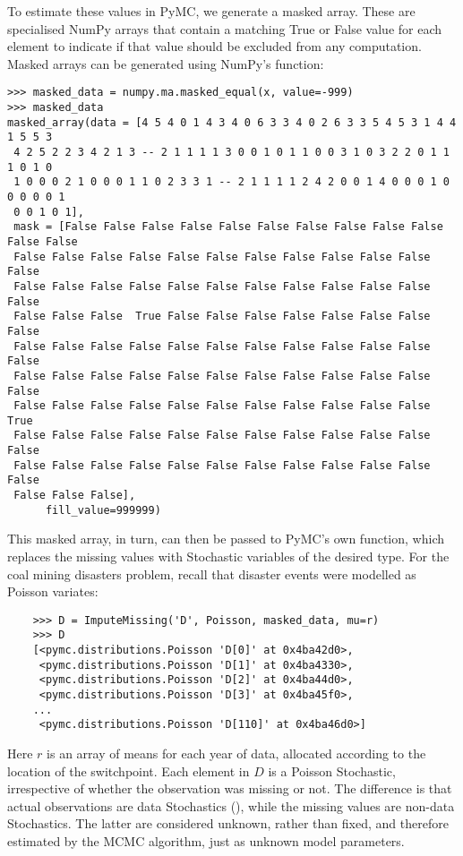 To estimate these values in PyMC, we generate a masked array. These are specialised NumPy arrays that contain a matching True or False value for each element to indicate if that value should be excluded from any computation. Masked arrays can be generated using NumPy's  function: 
\begin{verbatim}
>>> masked_data = numpy.ma.masked_equal(x, value=-999)
>>> masked_data
masked_array(data = [4 5 4 0 1 4 3 4 0 6 3 3 4 0 2 6 3 3 5 4 5 3 1 4 4 1 5 5 3
 4 2 5 2 2 3 4 2 1 3 -- 2 1 1 1 1 3 0 0 1 0 1 1 0 0 3 1 0 3 2 2 0 1 1 1 0 1 0 
 1 0 0 0 2 1 0 0 0 1 1 0 2 3 3 1 -- 2 1 1 1 1 2 4 2 0 0 1 4 0 0 0 1 0 0 0 0 0 1
 0 0 1 0 1],
 mask = [False False False False False False False False False False False False
 False False False False False False False False False False False False
 False False False False False False False False False False False False
 False False False  True False False False False False False False False
 False False False False False False False False False False False False
 False False False False False False False False False False False False
 False False False False False False False False False False False  True
 False False False False False False False False False False False False
 False False False False False False False False False False False False
 False False False],
      fill_value=999999)

\end{verbatim}

This masked array, in turn, can then be passed to PyMC's own  function, which replaces the missing values with Stochastic variables of the desired type. For the coal mining disasters problem, recall that disaster events were modelled as Poisson variates:

\begin{verbatim}
	>>> D = ImputeMissing('D', Poisson, masked_data, mu=r)
	>>> D
	[<pymc.distributions.Poisson 'D[0]' at 0x4ba42d0>,
	 <pymc.distributions.Poisson 'D[1]' at 0x4ba4330>,
	 <pymc.distributions.Poisson 'D[2]' at 0x4ba44d0>,
	 <pymc.distributions.Poisson 'D[3]' at 0x4ba45f0>,
	...
	 <pymc.distributions.Poisson 'D[110]' at 0x4ba46d0>]
\end{verbatim}

Here $r$ is an array of means for each year of data, allocated according to the location of the switchpoint. Each element in $D$ is a Poisson Stochastic, irrespective of whether the observation was missing or not. The difference is that actual observations are data Stochastics (), while the missing values are non-data Stochastics. The latter are considered unknown, rather than fixed, and therefore estimated by the MCMC algorithm, just as unknown model parameters.

